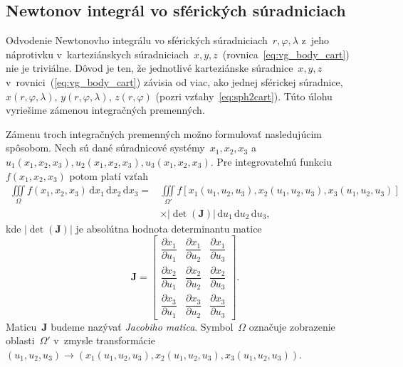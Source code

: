 \documentclass[a4paper, 12pt]{book}
\newcommand{\diff}{\mathrm d}
\let\vec\mathbf
\begin{document}
\subsection{Newtonov integrál vo sférických súradniciach}
\label{sec:newton_integral_in_spherical_coordinates}

Odvodenie Newtonovho integrálu vo sférických súradniciach~$r, \varphi, \lambda$ 
z~jeho náprotivku v~karteziánskych súradniciach~$x, y, 
z$~(rovnica~\ref{eq:vg_body_cart}) nie je triviálne.  Dôvod je ten, že 
jednotlivé karteziánske súradnice~$x, y, z$ v~rovnici~(\ref{eq:vg_body_cart}) 
závisia od viac, ako jednej sférickej súradnice, $x(r, \varphi, \lambda)$, 
$y(r, \varphi, \lambda)$, $z(r, \varphi)$ (pozri vzťahy~\ref{eq:sph2cart}).  
Túto úlohu vyriešime zámenou integračných premenných.

Zámenu troch integračných premenných možno formulovať nasledujúcim spôsobom.  
Nech sú dané súradnicové systémy~$x_1, x_2, x_3$ a~$u_1(x_1, x_2, x_3), 
u_2(x_1, x_2, x_3), u_3(x_1, x_2, x_3)$.  Pre integrovateľnú funkciu~$f(x_1, 
x_2, x_3)$ potom platí vzťah \parencite[napríklad][]{Arfken2005,Olver2010}
%
\begin{equation}
\label{eq:iiint_change_of_variable}
\begin{split}
\iiint\limits_{\Omega} f(x_1, x_2, x_3) \, \diff x_1 \, \diff x_2 \, \diff x_3 
 =& \iiint\limits_{\Omega'} f[x_1(u_1, u_2, u_3), x_2(u_1, u_2, u_3), x_3(u_1, 
 u_2, u_3)] \\
& \times | \det(\mathbf{J}) | \, \diff u_1 \, \diff u_2 \, \diff u_3{,}
\end{split}
\end{equation}
%
kde $| \det(\mathbf{J}) |$ je absolútna hodnota determinantu matice
%
\begin{equation}
\label{eq:jacobi}
\mathbf{J} = 
\begin{bmatrix}
\dfrac{\partial x_1}{\partial{u_1}} & \dfrac{\partial x_1}{\partial{u_2}} 
& \dfrac{\partial x_1}{\partial{u_3}}\\[2ex]
%
\dfrac{\partial x_2}{\partial{u_1}} & \dfrac{\partial x_2}{\partial{u_2}} 
& \dfrac{\partial x_2}{\partial{u_3}}\\[2ex]
%
\dfrac{\partial x_3}{\partial{u_1}} & \dfrac{\partial x_3}{\partial{u_2}} 
& \dfrac{\partial x_3}{\partial{u_3}}
\end{bmatrix}
%
{.}
\end{equation}
%
Maticu~$\vec J$ budeme nazývať \emph{Jacobiho matica}.  Symbol~$\Omega$ 
označuje zobrazenie oblasti~$\Omega'$ v~zmysle transformácie~$(u_1, u_2, u_3) 
\rightarrow (x_1(u_1, u_2, u_3), x_2(u_1, u_2, u_3), x_3(u_1, u_2, u_3))$.
\end{document}
